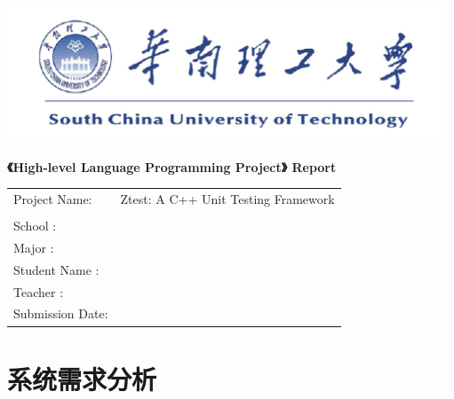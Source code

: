 \documentclass{article}
\begin{document}
\begin{titlepage}
    \centering
    \vspace*{1cm}

    \includegraphics[width=\textwidth]{img/logo.png} %

    \fontsize{24pt}{32pt}\selectfont
    \textbf{《High-level Language Programming Project》 Report}
    \vspace{6cm}

    \fontsize{20pt}{20pt}\selectfont
    \begin{tabular}{ll}
        Project Name:    & Ztest: A C++ Unit Testing Framework \\
                         &                                     \\
        School       :   & \hspace{6cm}                        \\
        Major        :   & \hspace{6cm}                        \\
        Student Name :   & \hspace{6cm}                        \\
        Teacher      :   & \hspace{6cm}                        \\
        Submission Date: & \hspace{6cm}                        \\
    \end{tabular}

    \vfill

    \vspace{1cm}
\end{titlepage}

\tableofcontents  %
\newpage
\section{系统需求分析}
\end{document}
